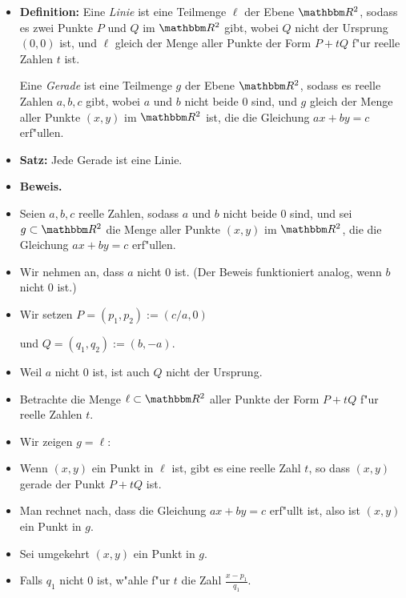 \documentclass[a4paper%
]{report}
\begin{document}
\newpage

\begin{itemize}[\mbox{}]
\item {\bfseries Definition:} Eine \emph{Linie} ist eine Teilmenge
  $\ell$ der Ebene $\R^2$, sodass es zwei Punkte $P$ und $Q$ im $\R^2$
  gibt, wobei $Q$ nicht der Ursprung $(0,0)$ ist, und $\ell$ gleich
  der Menge aller Punkte der Form $P+t Q$ f"ur reelle Zahlen $t$ ist.
  \medskip

  Eine \emph{Gerade} ist eine Teilmenge $g$ der Ebene $\R^2$, sodass
  es reelle Zahlen $a,b,c$ gibt, wobei $a$ und $b$ nicht beide $0$
  sind, und $g$ gleich der Menge aller Punkte $(x,y)$ im $\R^2$ ist,
  die die Gleichung $ax+by=c$ erf"ullen.
\item {\bfseries Satz:} Jede Gerade ist eine Linie.
\item {\bfseries Beweis.}
\item Seien $a,b,c$ reelle Zahlen, sodass $a$ und $b$ nicht beide $0$
  sind, und sei $g \subset \R^2$ die Menge aller Punkte $(x,y)$ im
  $\R^2$, die die Gleichung $ax+by=c$ erf"ullen.
\item Wir nehmen an, dass $a$ nicht $0$ ist. (Der Beweis funktioniert
  analog, wenn $b$ nicht $0$ ist.)
\item Wir setzen $P=(p_{1},p_{2}):=(c/a,0)$

  und $Q=(q_{1},q_{2}):=(b,-a)$.
\item Weil $a$ nicht $0$ ist, ist auch $Q$ nicht der Ursprung.
\item Betrachte die Menge $\ell \subset \R^2$ aller Punkte der Form
  $P+tQ$ f"ur reelle Zahlen $t$.
\item Wir zeigen $g=\ell$:
\item Wenn $(x,y)$ ein Punkt in $\ell$ ist, gibt es eine reelle Zahl
  $t$, so dass $(x,y)$ gerade der Punkt $P+tQ$ ist.
\item Man rechnet nach, dass die Gleichung $ax+by=c$ erf"ullt ist,
  also ist $(x,y)$ ein Punkt in $g$.
\item Sei umgekehrt $(x,y)$ ein Punkt in $g$.
\item Falls $q_1$ nicht $0$ ist, w"ahle f"ur $t$ die Zahl
  $\displaystyle \frac{x-p_1}{q_1}$.
  

\end{itemize}
\end{document}
